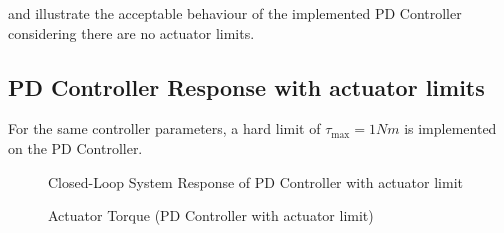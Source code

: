  and  illustrate the acceptable behaviour of the implemented PD Controller considering there are no actuator limits.

\subsection{PD Controller Response with actuator limits}
For the same controller parameters, a hard limit of $\tau_{\text{max}} = 1 Nm$ is implemented on the PD Controller.

\begin{figure}[h!]
	\centering
	\caption{Closed-Loop System Response of PD Controller with actuator limit}
	\label{fig:resPD_wLimit}
\end{figure}
\begin{figure}[h!]
	\centering
	\caption{Actuator Torque (PD Controller with actuator limit)}
	\label{fig:actPD_wLimit}
\end{figure}

